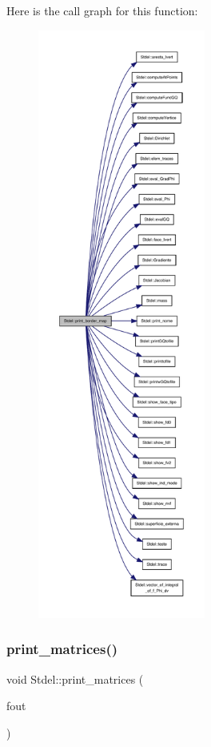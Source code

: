 Here is the call graph for this function\+:
\nopagebreak
\begin{figure}[H]
\begin{center}
\leavevmode
\includegraphics[height=550pt]{classStdel_a9a0c69dca7564f6ca4aa4f3c9864ea01_cgraph}
\end{center}
\end{figure}
\mbox{\label{classStdel_a319e6a16011b22e12028a841b7686f03}} 
\subsubsection{\texorpdfstring{print\+\_\+matrices()}{print\_matrices()}}
{\footnotesize\ttfamily void Stdel\+::print\+\_\+matrices (\begin{DoxyParamCaption}\item[{F\+I\+LE $\ast$}]{fout }\end{DoxyParamCaption})}



